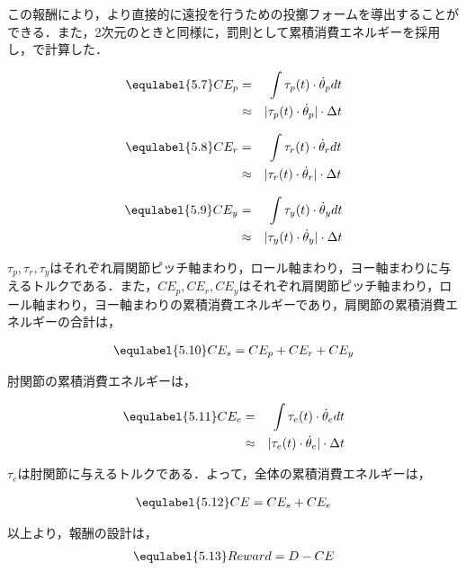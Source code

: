この報酬により，より直接的に遠投を行うための投擲フォームを導出することができる．また，2次元のときと同様に，罰則として累積消費エネルギーを採用し，で計算した．

\begin{eqnarray}
  \equlabel{5.7}
  CE_{p}&=&\int \tau_{p}(t)\cdot\dot{\theta}_{p} dt\\
        &\approx&|\tau_{p}(t)\cdot\dot{\theta}_{p}|\cdot\Delta t
\end{eqnarray}

\begin{eqnarray}
  \equlabel{5.8}
  CE_{r}&=&\int \tau_{r}(t)\cdot\dot{\theta}_{r} dt\\
        &\approx&|\tau_{r}(t)\cdot\dot{\theta}_{r}|\cdot\Delta t
\end{eqnarray}

\begin{eqnarray}
  \equlabel{5.9}
  CE_{y}&=&\int \tau_{y}(t)\cdot\dot{\theta}_{y} dt\\
        &\approx&|\tau_{y}(t)\cdot\dot{\theta}_{y}|\cdot\Delta t
\end{eqnarray}

$\tau_{p},\tau_{r},\tau_{y}$はそれぞれ肩関節ピッチ軸まわり，ロール軸まわり，ヨー軸まわりに与えるトルクである．また，$CE_{p},CE_{r},CE_{y}$はそれぞれ肩関節ピッチ軸まわり，ロール軸まわり，ヨー軸まわりの累積消費エネルギーであり，肩関節の累積消費エネルギーの合計は，

\begin{eqnarray}
  \equlabel{5.10}
  CE_{s} = CE_{p} + CE_{r} + CE_{y}
\end{eqnarray}

肘関節の累積消費エネルギーは，

\begin{eqnarray}
  \equlabel{5.11}
  CE_{e}&=&\int \tau_{e}(t)\cdot\dot{\theta}_{e} dt\\
        &\approx&|\tau_{e}(t)\cdot\dot{\theta}_{e}|\cdot\Delta t
\end{eqnarray}

$\tau_{e}$は肘関節に与えるトルクである．よって，全体の累積消費エネルギーは，

\begin{eqnarray}
  \equlabel{5.12}
  CE = CE_{s} + CE_{e}
\end{eqnarray}

以上より，報酬の設計は，
\begin{eqnarray}
  \equlabel{5.13}
  Reward = D - CE
\end{eqnarray}

